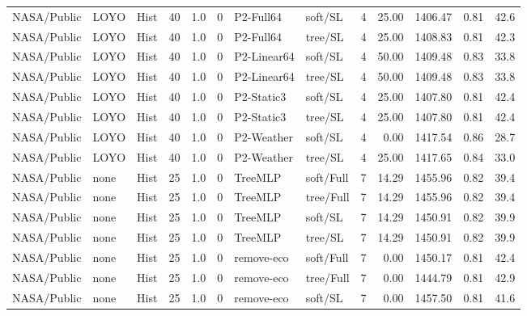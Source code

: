 \documentclass[10pt,a4paper]{article}
\begin{document}
\begin{landscape}
\begin{longtable}{llllllllrrrrr}
NASA/Public & LOYO & Hist & 40 & 1.0 & 0 & P2-Full64 & soft/SL & 4 & 25.00 & 1406.47 & 0.81 & 42.6 \\

NASA/Public & LOYO & Hist & 40 & 1.0 & 0 & P2-Full64 & tree/SL & 4 & 25.00 & 1408.83 & 0.81 & 42.3 \\

NASA/Public & LOYO & Hist & 40 & 1.0 & 0 & P2-Linear64 & soft/SL & 4 & 50.00 & 1409.48 & 0.83 & 33.8 \\

NASA/Public & LOYO & Hist & 40 & 1.0 & 0 & P2-Linear64 & tree/SL & 4 & 50.00 & 1409.48 & 0.83 & 33.8 \\

NASA/Public & LOYO & Hist & 40 & 1.0 & 0 & P2-Static3 & soft/SL & 4 & 25.00 & 1407.80 & 0.81 & 42.4 \\

NASA/Public & LOYO & Hist & 40 & 1.0 & 0 & P2-Static3 & tree/SL & 4 & 25.00 & 1407.80 & 0.81 & 42.4 \\

NASA/Public & LOYO & Hist & 40 & 1.0 & 0 & P2-Weather & soft/SL & 4 & 0.00 & 1417.54 & 0.86 & 28.7 \\

NASA/Public & LOYO & Hist & 40 & 1.0 & 0 & P2-Weather & tree/SL & 4 & 25.00 & 1417.65 & 0.84 & 33.0 \\

NASA/Public & none & Hist & 25 & 1.0 & 0 & TreeMLP & soft/Full & 7 & 14.29 & 1455.96 & 0.82 & 39.4 \\

NASA/Public & none & Hist & 25 & 1.0 & 0 & TreeMLP & tree/Full & 7 & 14.29 & 1455.96 & 0.82 & 39.4 \\

NASA/Public & none & Hist & 25 & 1.0 & 0 & TreeMLP & soft/SL & 7 & 14.29 & 1450.91 & 0.82 & 39.9 \\

NASA/Public & none & Hist & 25 & 1.0 & 0 & TreeMLP & tree/SL & 7 & 14.29 & 1450.91 & 0.82 & 39.9 \\

NASA/Public & none & Hist & 25 & 1.0 & 0 & remove-eco & soft/Full & 7 & 0.00 & 1450.17 & 0.81 & 42.4 \\

NASA/Public & none & Hist & 25 & 1.0 & 0 & remove-eco & tree/Full & 7 & 0.00 & 1444.79 & 0.81 & 42.9 \\

NASA/Public & none & Hist & 25 & 1.0 & 0 & remove-eco & soft/SL & 7 & 0.00 & 1457.50 & 0.81 & 41.6 \\


\end{longtable}
\end{landscape}
\end{document}
